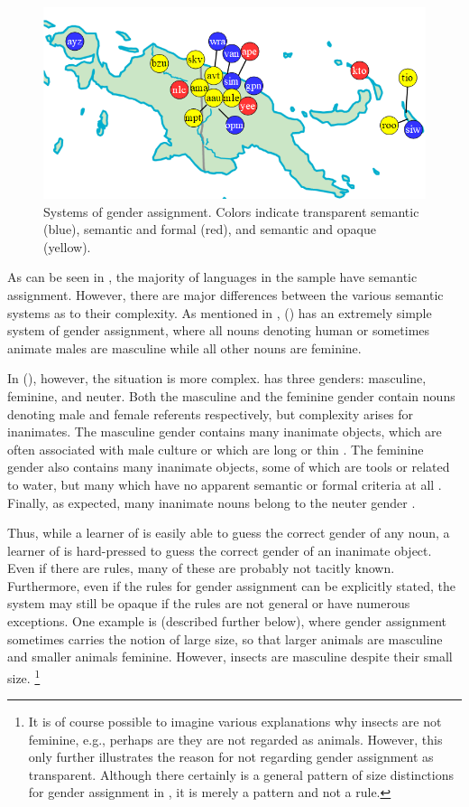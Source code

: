 \documentclass[output=collectionpaper]{langsci/langscibook}
\begin{document}
\begin{figure}[p]
\includegraphics[width=.8\textwidth]{figures/09/Simple/fig4.png}
\caption{Systems of gender assignment. Colors indicate transparent semantic (blue), semantic and formal (red), and semantic and opaque (yellow).}
\label{fig:Svard:4}
\end{figure}


As can be seen in , the majority of languages in the sample have semantic assignment. However, there are major differences between the various semantic systems as to their complexity. As mentioned in ,  () has an extremely simple system of gender assignment, where all nouns denoting human or sometimes animate males are masculine while all other nouns are feminine.

In  (), however, the situation is more complex.  has three genders: masculine, feminine, and neuter. Both the masculine and the feminine gender contain nouns denoting male and female referents respectively, but complexity arises for inanimates. The masculine gender contains many inanimate objects, which are often associated with male culture or which are long or thin \citep[46]{Robinson2011}. The feminine gender also contains many inanimate objects, some of which are tools or related to water, but many which have no apparent semantic or formal criteria at all \citep[47]{Robinson2011}. Finally, as expected, many inanimate nouns belong to the neuter gender \citep[48]{Robinson2011}.


Thus, while a learner of  is easily able to guess the correct gender of any noun, a learner of  is hard-pressed to guess the correct gender of an inanimate object. Even if there are rules, many of these are probably not tacitly known. Furthermore, even if the rules for gender assignment can be explicitly stated, the system may still be opaque if the rules are not general or have numerous exceptions. One example is  (described further below), where gender assignment sometimes carries the notion of large size, so that larger animals are masculine and smaller animals feminine. However, insects are masculine despite their small size.%
\footnote{It is of course possible to imagine various explanations why insects are not feminine, e.g., perhaps are they are not regarded as animals. However, this only further illustrates the reason for not regarding  gender assignment as transparent. Although there certainly is a general pattern of size distinctions for gender assignment in , it is merely a pattern and not a rule.}
\end{document}
